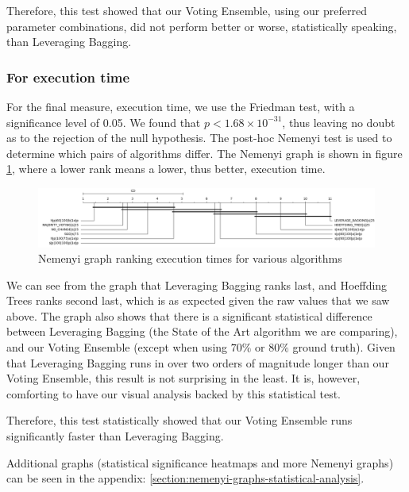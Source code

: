 Therefore, this test showed that our Voting Ensemble, using our preferred parameter combinations, did not perform better or worse, statistically speaking, than Leveraging Bagging.

\subsubsection{For execution time}

For the final measure, execution time, we use the Friedman test, with a significance level of 0.05. We found that $p < 1.68\times10^{-31}$, thus leaving no doubt as to the rejection of the null hypothesis. The post-hoc Nemenyi test is used to determine which pairs of algorithms differ. The Nemenyi graph is shown in figure  \ref{fig:sota_compare_all_execution_time_nemenyi}, where a lower rank means a lower, thus better, execution time.

\begin{figure}
  \includegraphics[width=\linewidth]{./images/chapter5/sota_compare_all_execution_time_nemenyi}
\caption{\label{fig:sota_compare_all_execution_time_nemenyi}Nemenyi graph ranking execution times for various algorithms}
\end{figure}

We can see from the graph that Leveraging Bagging ranks last, and Hoeffding Trees ranks second last, which is as expected given the raw values that we saw above. 
The graph also shows that there is a significant statistical difference between Leveraging Bagging (the State of the Art algorithm we are comparing), and our Voting Ensemble (except when using $70\%$ or $80\%$ ground truth). Given that Leveraging Bagging runs in over two orders of magnitude longer than our Voting Ensemble, this result is not surprising in the least. It is, however, comforting to have our visual analysis backed by this statistical test.

Therefore, this test statistically showed that our Voting Ensemble runs significantly faster than Leveraging Bagging.

Additional graphs (statistical significance heatmaps and more Nemenyi graphs) can be seen in the appendix: \ref{section:nemenyi-graphs-statistical-analysis}.

